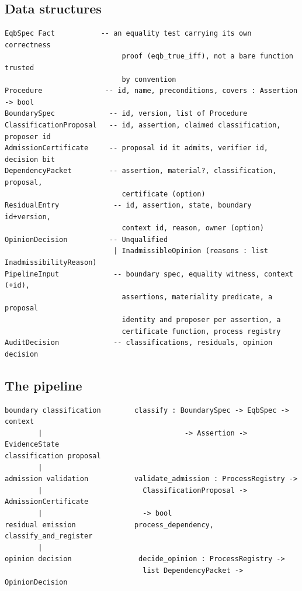 \documentclass[smallcondensed,envcountsect,natbib]{svjour3}
\begin{document}
\subsection*{Data structures}

\begin{lstlisting}
EqbSpec Fact           -- an equality test carrying its own correctness
                            proof (eqb_true_iff), not a bare function trusted
                            by convention
Procedure               -- id, name, preconditions, covers : Assertion -> bool
BoundarySpec             -- id, version, list of Procedure
ClassificationProposal   -- id, assertion, claimed classification, proposer id
AdmissionCertificate     -- proposal id it admits, verifier id, decision bit
DependencyPacket         -- assertion, material?, classification, proposal,
                            certificate (option)
ResidualEntry             -- id, assertion, state, boundary id+version,
                            context id, reason, owner (option)
OpinionDecision          -- Unqualified
                          | InadmissibleOpinion (reasons : list InadmissibilityReason)
PipelineInput             -- boundary spec, equality witness, context (+id),
                            assertions, materiality predicate, a proposal
                            identity and proposer per assertion, a
                            certificate function, process registry
AuditDecision             -- classifications, residuals, opinion decision
\end{lstlisting}

\subsection*{The pipeline}

\begin{lstlisting}
boundary classification        classify : BoundarySpec -> EqbSpec -> context
        |                                  -> Assertion -> EvidenceState
classification proposal
        |
admission validation           validate_admission : ProcessRegistry ->
        |                        ClassificationProposal -> AdmissionCertificate
        |                        -> bool
residual emission              process_dependency, classify_and_register
        |
opinion decision                decide_opinion : ProcessRegistry ->
                                 list DependencyPacket -> OpinionDecision
\end{lstlisting}
\end{document}
